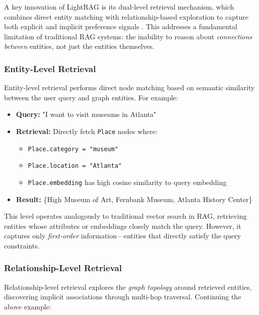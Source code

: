\documentclass{article} %
\begin{document}
A key innovation of LightRAG is its dual-level retrieval mechanism, which combines direct entity matching with relationship-based exploration to capture both explicit and implicit preference signals \citep{Zhu2024}. This addresses a fundamental limitation of traditional RAG systems: the inability to reason about \textit{connections between} entities, not just the entities themselves.

\subsubsection{Entity-Level Retrieval}

Entity-level retrieval performs direct node matching based on semantic similarity between the user query and graph entities. For example:

\begin{itemize}
    \item \textbf{Query:} "I want to visit museums in Atlanta"
    \item \textbf{Retrieval:} Directly fetch \texttt{Place} nodes where:
    \begin{itemize}
        \item \texttt{Place.category = "museum"}
        \item \texttt{Place.location = "Atlanta"}
        \item \texttt{Place.embedding} has high cosine similarity to query embedding
    \end{itemize}
    \item \textbf{Result:} \{High Museum of Art, Fernbank Museum, Atlanta History Center\}
\end{itemize}

This level operates analogously to traditional vector search in RAG, retrieving entities whose attributes or embeddings closely match the query. However, it captures only \textit{first-order} information—entities that directly satisfy the query constraints.

\subsubsection{Relationship-Level Retrieval}

Relationship-level retrieval explores the \textit{graph topology} around retrieved entities, discovering implicit associations through multi-hop traversal. Continuing the above example:
\end{document}

